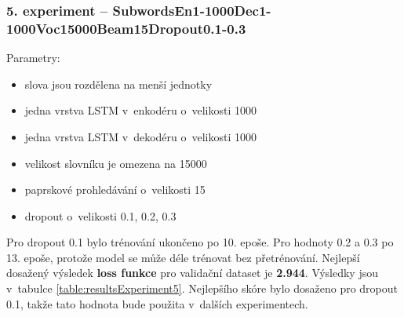 \subsubsection{5. experiment -- SubwordsEn1-1000Dec1-1000Voc15000Beam15Dropout0.1-0.3}\label{experiment5}
Parametry:
\begin{itemize}
  \item slova jsou rozdělena na menší jednotky
  \item jedna vrstva LSTM v~enkodéru o~velikosti 1000
  \item jedna vrstva LSTM v~dekodéru o~velikosti 1000
  \item velikost slovníku je omezena na 15000
  \item paprskové prohledávání o~velikosti 15
  \item dropout o~velikosti 0.1, 0.2, 0.3
\end{itemize}

 Pro dropout 0.1 bylo trénování ukončeno po 10. epoše. Pro hodnoty 0.2 a 0.3 po 13. epoše, protože model se může déle trénovat bez přetrénování. Nejlepší dosažený výsledek \textbf{loss funkce} pro validační dataset je \textbf{2.944}. Výsledky jsou v~tabulce \ref{table:resultsExperiment5}. Nejlepšího skóre bylo dosaženo pro dropout 0.1, takže tato hodnota bude použita v~dalších experimentech.

